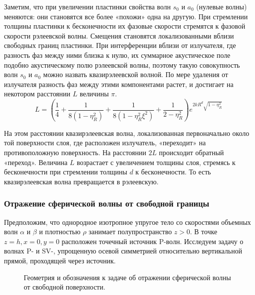 Заметим, что при увеличении пластинки свойства волн $s_0$ и $a_0$ (нулевые волны) меняются: они становятся все более «похожи» одна на другую. При стремлении толщины пластинки к бесконечности их фазовые скорости стремятся к фазовой скорости рэлеевской волны. Смещения становятся локализованными вблизи свободных границ пластинки. При интерференции вблизи от излучателя, где разность фаз между ними близка к нулю, их суммарное акустическое поле подобно акустическому полю рэлеевской волны, поэтому такую совокупность волн $s_0$ и $a_0$ можно назвать квазирэлеевской волной. По мере удаления от излучателя разность фаз между этими компонентами растет, и достигает на некотором расстоянии $L$ величины $\pi$. 
\begin{equation}
L = (\frac{1}{4} + \frac{1}{8(1- \eta_{R}^{2})} + \frac{1}{8(1- \eta_{R}^{2} \xi^2)} + \frac{1}{2- \eta_{R}^{2}} ) e^{2kR^d\sqrt{1- \eta_{R}^{2}}}
\end{equation}

На этом расстоянии квазирэлеевская волна, локализованная первоначально около той поверхности слоя, где расположен излучатель, «переходит» на противоположную поверхность. На расстоянии $2L$ происходит обратный «переход». Величина $L$ возрастает с увеличением толщины слоя, стремясь к бесконечности при стремлении толщины $d$ к бесконечности. То есть квазирэлеевская волна превращается в рэлеевскую.


\subsubsection{Отражение сферической волны от свободной границы}

Предположим, что однородное изотропное упругое тело со скоростями объемных волн $\alpha$ и $\beta$ и плотностью $\rho$ занимает полупространство $z > 0$.  В точке $z = h, x = 0, y = 0$ расположен точечный источник P-волн. Исследуем задачу о волнах P- и SV-, упрощенную осевой симметрией относительно вертикальной прямой, проходящей через источник. 

\begin{figure}[h]
\caption{Геометрия и обозначения к задаче об отражении сферической волны от свободной поверхности.}
\end{figure}

